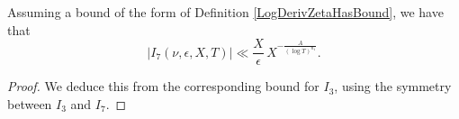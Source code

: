 \begin{lemma}[I7GenBound]
\label{I7GenBound}
\leanok
Assuming a bound of the form of Definition \ref{LogDerivZetaHasBound}, we have that
  $$
  \left|I_7(\nu,\epsilon,X,T)\right|\ll\frac{X}{\epsilon}\, X^{-\frac{A}{(\log T)^{n_1}}}.
  $$
\end{lemma}
\begin{proof}
\leanok
We deduce this from the corresponding bound for $I_3$, using the symmetry between $I_3$ and $I_7$.
\end{proof}
